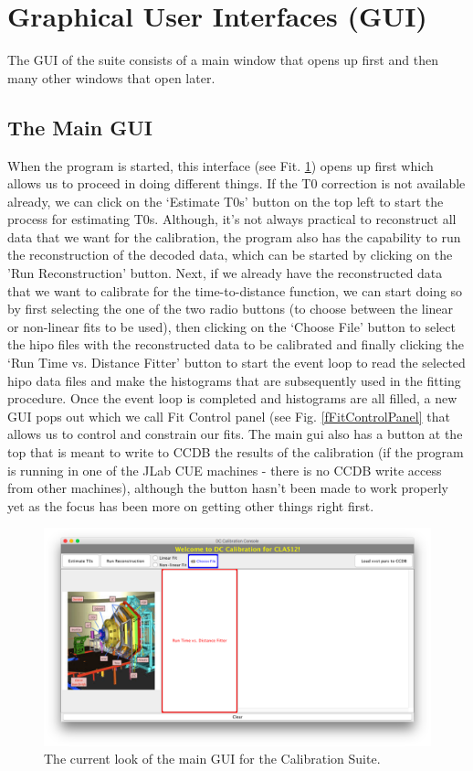 \documentclass[12pt,epsfig]{article}
\begin{document}
\section{Graphical User Interfaces (GUI)}
The GUI of the suite consists of a main window that opens up first and then many other windows that open later. 

\subsection{The Main GUI} 
When the program is started, this interface (see Fit. \ref{fMainGUI}) opens up first which allows us to proceed in doing different things. If the T0 correction is not available already, we can click on the `Estimate T0s' button on the top left to start the process for estimating T0s. Although, it's not always practical to reconstruct all data that we want for the calibration, the program also has the capability to run the reconstruction of the decoded data, which can be started by clicking on the 'Run Reconstruction' button. Next, if we already have the reconstructed data that we want to calibrate for the time-to-distance function, we can start doing so by first selecting the one of the two radio buttons (to choose between the linear or non-linear fits to be used), then clicking on the `Choose File' button to select the hipo files with the reconstructed data to be calibrated and finally clicking the `Run Time vs. Distance Fitter' button to start the event loop to read the selected hipo data files and make the histograms that are subsequently used in the fitting procedure. Once the event loop is completed and histograms are all filled, a new GUI pops out which we call Fit Control panel (see Fig. \ref{fFitControlPanel} that allows us to control and constrain our fits. The main gui also has a button at the top that is meant to write to CCDB the results of the calibration (if the program is running in one of the JLab CUE machines - there is no CCDB write access from other machines), although the button hasn't been made to work properly yet as the focus has been more on getting other things right first.

\begin{figure} [H] %
    \centering
    \includegraphics[width=1.0\textwidth]{Figures/Screenshots/screenshotMainGuiDCcalibSuite.png}
    \caption{The current look of the main GUI for the Calibration Suite.}
    \label{fMainGUI}
\end{figure}
\end{document}
